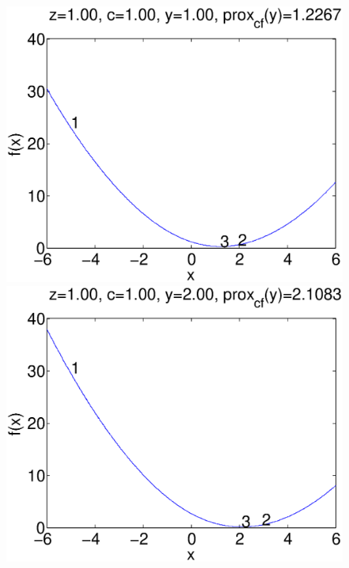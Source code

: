 \documentclass{scrartcl}
\begin{document}
\begin{figure}[H]
  \begin{minipage}[b]{0.3\textwidth}
    \centering
    \includegraphics[scale=0.26]{prob_8_y_1_c_1_z_1.eps}
  \end{minipage}
  \quad
  \begin{minipage}[b]{0.3\textwidth}
    \centering
    \includegraphics[scale=0.26]{prob_8_y_2_c_1_z_1.eps}
  \end{minipage}
  \quad
  \begin{minipage}[b]{0.3\textwidth}
    \centering

\end{minipage}
\end{figure}
\end{document}
